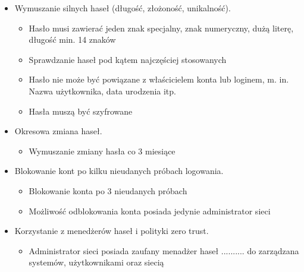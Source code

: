 \begin{itemize}
    \item Wymuszanie silnych haseł (długość, złożoność, unikalność).
    \begin{itemize}
        \item {Hasło musi zawierać jeden znak specjalny, znak numeryczny, dużą literę, długość min. 14 znaków}
        \item {Sprawdzanie haseł pod kątem najczęściej stosowanych}
        \item {Hasło nie może być powiązane z właścicielem konta lub loginem, m. in. Nazwa użytkownika, data urodzenia itp.}
        \item {Hasła muszą być szyfrowane}
    \end{itemize}
    
    \item Okresowa zmiana haseł.
    \begin{itemize}
        \item{Wymuszanie zmiany hasła co 3 miesiące}
    \end{itemize}
    
    \item Blokowanie kont po kilku nieudanych próbach logowania.
    \begin{itemize}
        \item{Blokowanie konta po 3 nieudanych próbach}
        \item{Możliwość odblokowania konta posiada jedynie administrator sieci}
    \end{itemize}
    
    \item Korzystanie z menedżerów haseł i polityki zero trust.
    \begin{itemize}
        \item {Administrator sieci posiada zaufany menadżer haseł .......... do zarządzana systemów, użytkownikami oraz siecią}
    \end{itemize}
\end{itemize}